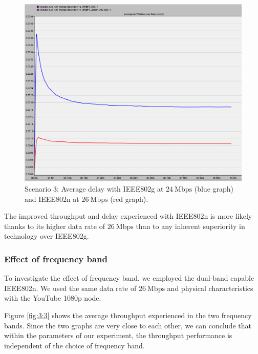 \begin{figure}[H]
	\centering
	\includegraphics[scale=0.29]{Figures/amantianrenamed/Scenario3AverageDelayof80211g24Mbpsand8021126Mbps.png}
	\caption[Scenario 3: average delay according to the WiFi technology used]{Scenario 3: Average delay with \gls{IEEE802}g at $24~\mathrm{Mbps}$ (blue graph) and \gls{IEEE802}n at $26~\mathrm{Mbps}$ (red graph).}
	\label{fig:3:2}
\end{figure}

The improved throughput and delay experienced with \gls{IEEE802}n is more likely thanks to its higher data rate of $26~\mathrm{Mbps}$ than to any inherent superiority in technology over \gls{IEEE802}g.

\subsubsection{Effect of frequency band} \label{subsub:3:freq}
To investigate the effect of frequency band, we employed the dual-band capable \gls{IEEE802}n. We used the same data rate of $26~\mathrm{Mbps}$ and physical characteristics with the YouTube 1080p node. 

Figure \ref{fig:3:3} shows the average throughput experienced in the two frequency bands. Since the two graphs are very
close to each other, we can conclude that within the parameters of our experiment, the throughput performance is independent of the choice of frequency band.

